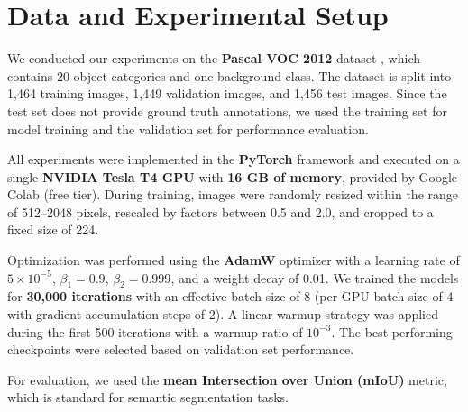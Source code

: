 \section{Data and Experimental Setup}
\label{subsec:data_and_experimental_setup}

We conducted our experiments on the \textbf{Pascal VOC 2012} dataset \cite{dataset_pascal_voc}, 
which contains 20 object categories and one background class. 
The dataset is split into 1,464 training images, 1,449 validation images, 
and 1,456 test images. Since the test set does not provide ground truth 
annotations, we used the training set for model training and the validation 
set for performance evaluation.

All experiments were implemented in the \textbf{PyTorch} framework and executed 
on a single \textbf{NVIDIA Tesla T4 GPU} with \textbf{16 GB of memory}, 
provided by Google Colab (free tier). During training, images were randomly 
resized within the range of 512--2048 pixels, rescaled by factors between 
0.5 and 2.0, and cropped to a fixed size of 224.

Optimization was performed using the \textbf{AdamW} optimizer with a learning 
rate of $5 \times 10^{-5}$, $\beta_1 = 0.9$, $\beta_2 = 0.999$, and a weight 
decay of 0.01. We trained the models for \textbf{30,000 iterations} with an 
effective batch size of 8 (per-GPU batch size of 4 with gradient accumulation 
steps of 2). A linear warmup strategy was applied during the first 500 iterations 
with a warmup ratio of $10^{-3}$. The best-performing checkpoints were selected 
based on validation set performance.

For evaluation, we used the \textbf{mean Intersection over Union (mIoU)} metric, 
which is standard for semantic segmentation tasks. 

